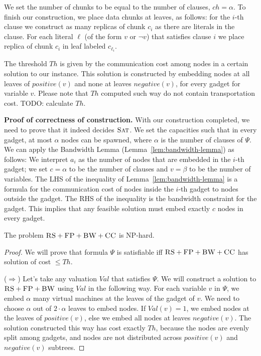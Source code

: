 \documentclass[9pt,twocolumn]{scrartcl}
\newcommand{\clauses}{\alpha}
\newcommand{\variables}{\beta}
\newcommand{\achunk}{c}
\newcommand{\CC}{\textsc{CC}}
\newcommand{\FP}{\textsc{FP}}
\newcommand{\RS}{\textsc{RS}}
\newcommand{\BW}{\textsc{BW}}
\newcommand{\SAT}{\textsc{Sat}}
\newcommand{\Formula}{\ensuremath{\Psi}}
\newcommand{\ChunkTypes}{\ensuremath{ch}}
\newcommand{\Thr}{\ensuremath{Th}}
\newcommand{\positive}{\ensuremath{positive}}
\newcommand{\negative}{\ensuremath{negative}}
\newcommand{\Val}{\ensuremath{Val}}
\begin{document}
\begin{appendix}
We set the number of chunks to be equal to the number of clauses, $\ChunkTypes =
\clauses$. To finish our construction, we place data chunks at
leaves, as follows: for the $i$-th clause we
construct as many replicas of chunk $\achunk_i$ as there are literals in the
clause. For each literal $\ell$ (of the form $v$ or $\neg v$) that satisfies clause $i$ we place
replica of chunk $\achunk_i$ in leaf labeled $\achunk_{\ell_i}$.

The threshold $\Thr$ is given by the
communication cost among nodes in
a certain solution to our instance. This solution is constructed by embedding
nodes at all leaves of $\positive(v)$ and none at leaves
$\negative(v)$, for every gadget for variable $v$. Please note that $\Thr$
computed such way do not contain transportation cost. TODO: calculate
$\Thr$.

\textbf{Proof of correctness of construction.}
With our construction completed, we need to prove that it indeed
decides $\SAT$. We set the capacities such that in every gadget,
at most $\clauses$ nodes can be spawned, where $\clauses$
is the number of clauses of $\Formula$.
We can apply the Bandwidth Lemma (Lemma~\ref{lem:bandwidth-lemma}) as follows:
We interpret $a_i$ as the
number of nodes that are embedded in the $i$-th gadget; we set $c=\clauses$ 
to be the number
of clauses and $v=\variables$ to be the number of variables. 
The LHS of the inequality of Lemma~\ref{lem:bandwidth-lemma}
is a formula for the communication cost of nodes inside the $i$-th
gadget to nodes outside the gadget. The RHS of the inequality is the
bandwidth constraint for the gadget. This implies that
any feasible solution must embed exactly $c$ nodes in every gadget.


\begin{theorem}
The problem $\RS+\FP+\BW+\CC$ is NP-hard.
\end{theorem}
\begin{proof}
We will prove that formula $\Formula$ is satisfiable iff $\RS+\FP+\BW+\CC$ has
solution of cost $\leq \Thr$.

($\Rightarrow$) Let's take any valuation $\Val$ that satisfies $\Formula$. 
We will construct a solution to $\RS+\FP+\BW$ using $\Val$ in the following way. 
For each variable $v$ in $\Formula$, we embed $\clauses$ many virtual machines 
at the  leaves of the gadget of $v$. We need to choose $\clauses$ out of
$2 \cdot \clauses$ leaves to embed nodes. If $\Val(v) = 1$, we embed
nodes at the leaves
of $\positive(v)$, else we embed all nodes at leaves $\negative(v)$. 
The solution constructed this way has cost exactly
$\Thr$, because the nodes are evenly split among gadgets, and nodes are not
distributed across $\positive(v)$ and $\negative(v)$ subtrees.


\end{proof}
\end{appendix}
\end{document}
